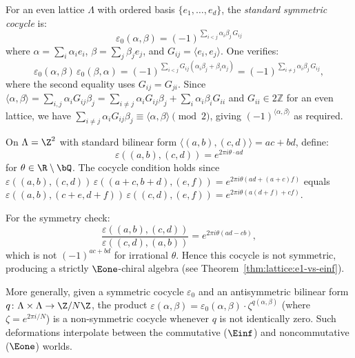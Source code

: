 \begin{construction}\label{constr:lattice:standard-cocycle}
For an even lattice $\Lambda$ with ordered basis $\{e_1, \ldots, e_d\}$,
the \emph{standard symmetric cocycle} is:
\begin{equation}\label{eq:lattice:standard-cocycle}
\varepsilon_0(\alpha, \beta)
= (-1)^{\sum_{i < j} \alpha_i \beta_j \, G_{ij}}
\end{equation}
where $\alpha = \sum_i \alpha_i e_i$, $\beta = \sum_j \beta_j e_j$,
and $G_{ij} = \langle e_i, e_j \rangle$.
One verifies:
\[
\varepsilon_0(\alpha,\beta)\,\varepsilon_0(\beta,\alpha)
= (-1)^{\sum_{i<j} G_{ij}(\alpha_i\beta_j + \beta_i\alpha_j)}
= (-1)^{\sum_{i \neq j} \alpha_i \beta_j \, G_{ij}},
\]
where the second equality uses $G_{ij} = G_{ji}$. Since $\langle\alpha,\beta\rangle = \sum_{i,j} \alpha_i G_{ij}\beta_j = \sum_{i \neq j}\alpha_i G_{ij}\beta_j + \sum_i \alpha_i\beta_i G_{ii}$ and $G_{ii} \in 2\mathbb{Z}$ for an even lattice, we have $\sum_{i \neq j}\alpha_i G_{ij}\beta_j \equiv \langle\alpha,\beta\rangle \pmod{2}$, giving $(-1)^{\langle\alpha,\beta\rangle}$ as required.
\end{construction}

\begin{example}\label{ex:lattice:nonsym-z2}
On $\Lambda = \Z^2$ with standard bilinear form
$\langle (a,b), (c,d) \rangle = ac + bd$, define:
\[
\varepsilon((a,b), (c,d)) = e^{2\pi i \theta \cdot ad}
\]
for $\theta \in \R \setminus \bQ$.
The cocycle condition holds since
$\varepsilon((a,b),(c,d))\,\varepsilon((a+c,b+d),(e,f))
= e^{2\pi i\theta(ad + (a+c)f)}$
equals
$\varepsilon((a,b),(c+e,d+f))\,\varepsilon((c,d),(e,f))
= e^{2\pi i\theta(a(d+f) + cf)}$.

For the symmetry check:
\[
\frac{\varepsilon((a,b),(c,d))}{\varepsilon((c,d),(a,b))}
= e^{2\pi i\theta(ad - cb)},
\]
which is not $(-1)^{ac+bd}$ for irrational $\theta$. Hence this cocycle
is not symmetric, producing a strictly $\Eone$-chiral algebra
(see Theorem~\ref{thm:lattice:e1-vs-einf}).
\end{example}

\begin{remark}
\label{rem:lattice:root-of-unity-deformation}
More generally, given a symmetric cocycle $\varepsilon_0$ and an
antisymmetric bilinear form $q \colon \Lambda \times \Lambda \to \Z/N\Z$,
the product
$\varepsilon(\alpha, \beta) = \varepsilon_0(\alpha, \beta) \cdot
\zeta^{q(\alpha,\beta)}$
(where $\zeta = e^{2\pi i/N}$) is a non-symmetric cocycle whenever $q$
is not identically zero. Such deformations interpolate between the
commutative ($\Einf$) and noncommutative ($\Eone$) worlds.
\end{remark}


